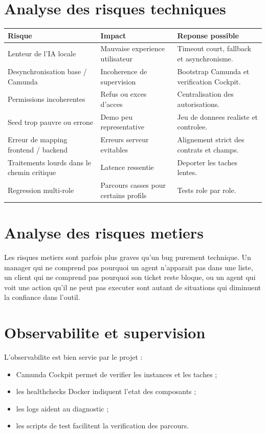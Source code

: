 \documentclass[12pt,a4paper,oneside]{report}
\begin{document}
\section{Analyse des risques techniques}

\begin{longtable}{>{\raggedright\arraybackslash}p{4.4cm} >{\raggedright\arraybackslash}p{3cm} >{\raggedright\arraybackslash}p{5.1cm}}
\toprule
Risque & Impact & Reponse possible \\
\midrule
Lenteur de l'IA locale & Mauvaise experience utilisateur & Timeout court, fallback et asynchronisme. \\
Desynchronisation base / Camunda & Incoherence de supervision & Bootstrap Camunda et verification Cockpit. \\
Permissions incoherentes & Refus ou exces d'acces & Centralisation des autorisations. \\
Seed trop pauvre ou errone & Demo peu representative & Jeu de donnees realiste et controlee. \\
Erreur de mapping frontend / backend & Erreurs serveur evitables & Alignement strict des contrats et champs. \\
Traitements lourds dans le chemin critique & Latence ressentie & Deporter les taches lentes. \\
Regression multi-role & Parcours casses pour certains profils & Tests role par role. \\
\bottomrule
\end{longtable}

\section{Analyse des risques metiers}

Les risques metiers sont parfois plus graves qu'un bug purement technique. Un manager qui ne comprend pas pourquoi un agent n'apparait pas dans une liste, un client qui ne comprend pas pourquoi son ticket reste bloque, ou un agent qui voit une action qu'il ne peut pas executer sont autant de situations qui diminuent la confiance dans l'outil.

\section{Observabilite et supervision}

L'observabilite est bien servie par le projet :

\begin{itemize}[leftmargin=1.2cm]
  \item Camunda Cockpit permet de verifier les instances et les taches ;
  \item les healthchecks Docker indiquent l'etat des composants ;
  \item les logs aident au diagnostic ;
  \item les scripts de test facilitent la verification des parcours.
\end{itemize}
\end{document}
